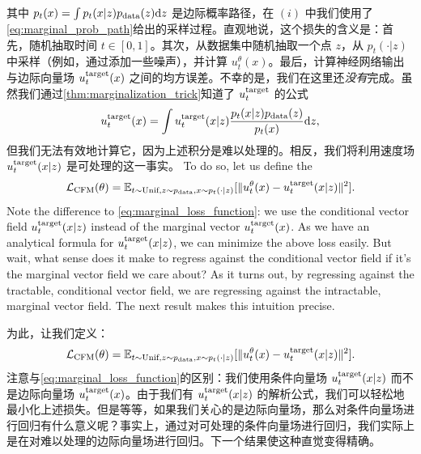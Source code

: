 其中 $p_t(x)=\int p_t(x|z)p_{\rm{data}}(z) \mathrm{d} z$ 是边际概率路径，在 $(i)$ 中我们使用了\cref{eq:marginal_prob_path}给出的采样过程。直观地说，这个损失的含义是：首先，随机抽取时间 $t \in [0,1]$。其次，从数据集中随机抽取一个点 $z$，从 $p_t(\cdot|z)$ 中采样（例如，通过添加一些噪声），并计算 $u_t^\theta(x)$。最后，计算神经网络输出与边际向量场 $u^{\text{target}}_t(x)$ 之间的均方误差。不幸的是，我们在这里还\textit{没有}完成。虽然我们通过\cref{thm:marginalization_trick}知道了 $u^{\text{target}}_t$ 的公式
\begin{align}
\label{eq:marginal_vector_field_stated_again}
    u^{\text{target}}_t(x) = \int u^{\text{target}}_t(x|z)\frac{ p_t(x|z)p_{\rm{data}}(z)}{p_t(x)}\mathrm{d} z,
\end{align}
但我们无法有效地计算它，因为上述积分是难以处理的。相反，我们将利用速度场 $u^{\text{target}}_t(x|z)$ 是可处理的这一事实。 
To do so, let us define the  
\begin{align}
\label{eq:cfm}
\mathcal{L}_{\text{CFM}}(\theta) =     \mathbb{E}_{t\sim \text{Unif}, z\sim p_{\rm{data}}, x\sim p_t(\cdot|z)}[\|u_t^\theta(x) - u^{\text{target}}_t(x|z)\|^2].
\end{align}
Note the difference to     \cref{eq:marginal_loss_function}: we use the conditional vector field $u^{\text{target}}_t(x|z)$ instead of the marginal vector $u^{\text{target}}_t(x)$. As we have an analytical formula for $u^{\text{target}}_t(x|z)$, we can minimize the above loss easily. But wait, what sense does it make to regress against the conditional vector field if it's the marginal vector field we care about? As it turns out, by  regressing against the tractable, conditional vector field, we are  regressing against the intractable, marginal vector field. The next result makes this intuition precise.

为此，让我们定义：
\begin{align}
\label{eq:cfm}
\mathcal{L}_{\text{CFM}}(\theta) =     \mathbb{E}_{t\sim \text{Unif}, z\sim p_{\rm{data}}, x\sim p_t(\cdot|z)}[\|u_t^\theta(x) - u^{\text{target}}_t(x|z)\|^2].
\end{align}
注意与\cref{eq:marginal_loss_function}的区别：我们使用条件向量场 $u^{\text{target}}_t(x|z)$ 而不是边际向量场 $u^{\text{target}}_t(x)$。由于我们有 $u^{\text{target}}_t(x|z)$ 的解析公式，我们可以轻松地最小化上述损失。但是等等，如果我们关心的是边际向量场，那么对条件向量场进行回归有什么意义呢？事实上，通过对可处理的条件向量场进行回归，我们实际上是在对难以处理的边际向量场进行回归。下一个结果使这种直觉变得精确。

